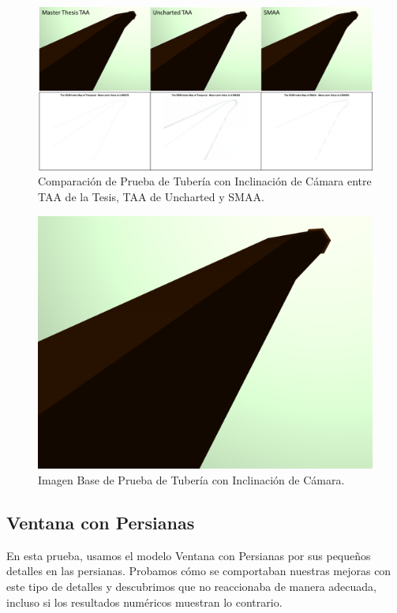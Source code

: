 \documentclass[pregrado]{tesis-usb} %
\begin{document}
\begin{figure}[!htb]
	\centering
	\includegraphics[scale=0.7]{images/results/pipe_inclination.png}
	\caption{Comparación de Prueba de Tubería con Inclinación de Cámara entre TAA de la Tesis, TAA de Uncharted y SMAA.}\label{fig:pipe_inclination_render}
\end{figure}

\begin{figure}[!htb]
	\centering
	\includegraphics[scale=0.2]{images/results/pipe_with_inclination_sobel_ground_truth.png}
	\caption{Imagen Base de Prueba de Tubería con Inclinación de Cámara.}\label{fig:pipe_inclination_truth}
\end{figure}

\FloatBarrier

\subsection{Ventana con Persianas}
En esta prueba, usamos el modelo Ventana con Persianas por sus pequeños detalles en las persianas. Probamos cómo se comportaban nuestras mejoras con este tipo de detalles y descubrimos que no reaccionaba de manera adecuada, incluso si los resultados numéricos muestran lo contrario. 
\end{document}
